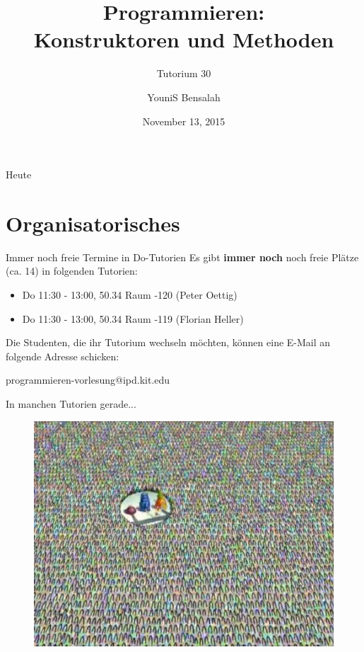 \documentclass[18pt]{beamer}
\title[Konstruktoren und Methoden]{Programmieren:\\ Konstruktoren und Methoden}
\subtitle{Tutorium 30}
\author{YouniS Bensalah}
\date{November 13, 2015}
\institute{Chair for Software Design and Quality}
\begin{document}

\begin{frame}
\titlepage
\end{frame}

\begin{frame}{Heute}
\tableofcontents
\end{frame}

\section{Organisatorisches}

\begin{frame}{Immer noch freie Termine in Do-Tutorien}
    Es gibt \textbf{immer noch} noch freie Plätze (ca. 14) in folgenden Tutorien:
    \begin{itemize}
        \item Do 11:30 - 13:00, 50.34 Raum -120 (Peter Oettig)
        \item Do 11:30 - 13:00, 50.34 Raum -119 (Florian Heller)
    \end{itemize}
    Die Studenten, die ihr Tutorium wechseln möchten, können eine E-Mail an folgende Adresse schicken:\\
    \begin{center}
    {\Large programmieren-vorlesung@ipd.kit.edu}
    \end{center}
\end{frame}

\begin{frame}{In manchen Tutorien gerade...}
    \begin{figure}
        \includegraphics[scale=.5]{img/tuturien.jpg}
    \end{figure}
\end{frame}
\end{document}
